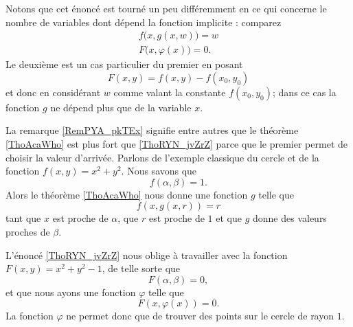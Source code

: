 \begin{remark}\label{RemPYA_pkTEx}
    Notons que cet énoncé est tourné un peu différemment en ce qui concerne le nombre de variables dont dépend la fonction implicite : comparez
    \begin{subequations}
        \begin{align}
            f\big( x,g(x,w) \big)=w\\
            F\big( x,\varphi(x) \big)=0.
        \end{align}
    \end{subequations}
    Le deuxième est un cas particulier du premier en posant 
    \begin{equation}
        F(x,y)=f(x,y)-f(x_0,y_0)
    \end{equation}
    et donc en considérant \( w\) comme valant la constante \( f(x_0,y_0)\); dans ce cas la fonction \( g\) ne dépend plus que de la variable \( x\).

\end{remark}

\begin{example}
    La remarque \ref{RemPYA_pkTEx} signifie entre autres que le théorème \ref{ThoAcaWho} est plus fort que \ref{ThoRYN_jvZrZ} parce que le premier permet de choisir la valeur d'arrivée. Parlons de l'exemple classique du cercle et de la fonction \( f(x,y)=x^2+y^2\). Nous savons que
    \begin{equation}
        f(\alpha,\beta)=1.
    \end{equation}
    Alors le théorème \ref{ThoAcaWho} nous donne une fonction \( g\) telle que
    \begin{equation}
        f(x,g(x,r))=r
    \end{equation}
    tant que \( x\) est proche de \( \alpha\), que \( r\) est proche de \( 1\) et que \( g\) donne des valeurs proches de \( \beta\).

    L'énoncé \ref{ThoRYN_jvZrZ} nous oblige à travailler avec la fonction \( F(x,y)=x^2+y^2-1\), de telle sorte que
    \begin{equation}
        F(\alpha,\beta)=0,
    \end{equation}
    et que nous ayons une fonction \( \varphi\) telle que
    \begin{equation}
        F(x,\varphi(x))=0.
    \end{equation}
    La fonction \( \varphi\) ne permet donc que de trouver des points sur le cercle de rayon \( 1\).
\end{example}

